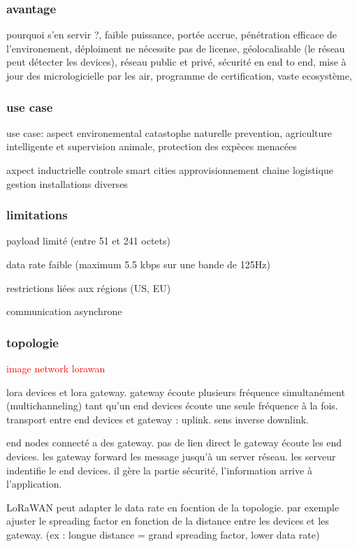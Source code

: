 \documentclass[12pt,a4paper,oneside, titlepage]{report}
\begin{document}
\subsubsection{avantage}

pourquoi s'en servir ?,
faible puissance, 
portée accrue, 
pénétration efficace de l'environement,
déploiment ne nécessite pas de license,
géolocalisable (le réseau peut détecter les devices),
réseau public et privé,
sécurité en end to end,
mise à jour des micrologicielle par les air,
programme de certification,
vaste ecosystème,

\subsubsection{use case}

use case:
aspect environemental 
catastophe naturelle prevention,
agriculture intelligente et supervision animale,
protection des expèces menacées

axpect inductrielle
controle smart cities
approvisionnement chaine logistique
gestion installations diverses

\subsubsection{limitations}

payload limité (entre 51 et 241 octets)

data rate faible (maximum 5.5 kbps sur une bande de 125Hz)

restrictions liées aux régions (US, EU)

communication asynchrone 


\subsubsection{topologie}

\textcolor{red}{image network lorawan}

lora devices et lora gateway. gateway écoute plusieurs fréquence simultanément (multichanneling) tant qu'un end devices écoute une seule fréquence à la fois. transport entre end devices et gateway : uplink. sens inverse downlink.


end nodes connecté a des gateway. pas de lien direct le gateway écoute les end devices. les gateway forward les message jusqu'à un server réseau. les serveur indentifie le end devices. il gère la partie sécurité, l'information arrive à l'application.

LoRaWAN peut adapter le data rate en focntion de la topologie. par exemple ajuster le spreading factor en fonction de la distance entre les devices et les gateway. (ex : longue distance = grand spreading factor, lower data rate)
\end{document}
